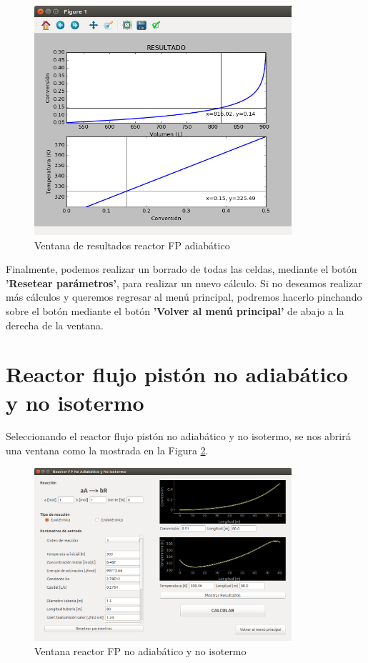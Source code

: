 \begin{figure}[h!]
	\begin{center}
		\includegraphics[width=0.85\textwidth]{./imagenes/reactor_fp/adiabatico2.png}\caption{Ventana de resultados reactor FP adiabático}\label{fig:ventana_graficas_ad}
	\end{center}
\end{figure}

Finalmente, podemos realizar un borrado de todas las celdas, mediante el botón \textbf{'Resetear parámetros'}, para realizar un nuevo cálculo. Si no deseamos realizar más cálculos y queremos regresar al menú principal, podremos hacerlo pinchando sobre el botón mediante el botón \textbf{'Volver al menú principal'} de abajo a la derecha de la ventana.


\section{Reactor flujo pistón no adiabático y no isotermo}
Seleccionando el reactor flujo pistón no adiabático y no isotermo, se nos abrirá una ventana como la mostrada en la Figura \ref{fig:ventana_noadi_noiso}.

\begin{figure}[h!]
	\begin{center}
		\includegraphics[width=0.85\textwidth]{./imagenes/reactor_fp/no_adi_no_iso1.png}\caption{Ventana reactor FP no adiabático y no isotermo}\label{fig:ventana_noadi_noiso}
	\end{center}
\end{figure}

